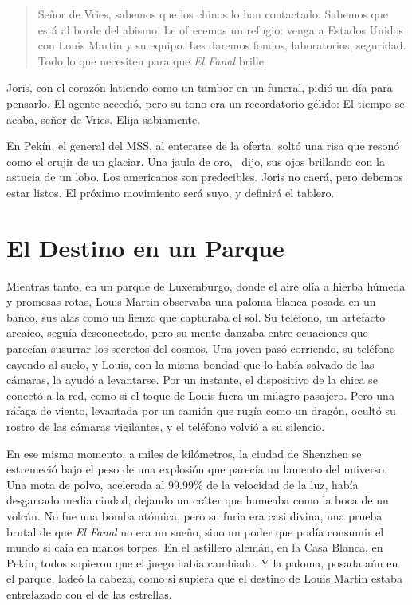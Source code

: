 \begin{quote}
\calli
\glqq Señor de Vries, sabemos que los chinos lo han contactado. Sabemos que está al borde del abismo. Le ofrecemos un refugio: venga a Estados Unidos con Louis Martin y su equipo. Les daremos fondos, laboratorios, seguridad. Todo lo que necesiten para que \emph{El Fanal} brille.\grqq
\end{quote}

Joris, con el corazón latiendo como un tambor en un funeral, pidió un día para pensarlo. El agente accedió, pero su tono era un recordatorio gélido: \glqq El tiempo se acaba, señor de Vries. Elija sabiamente.\grqq

En Pekín, el general del MSS, al enterarse de la oferta, soltó una risa que resonó como el crujir de un glaciar. \glqq Una jaula de oro,\grqq~ dijo, sus ojos brillando con la astucia de un lobo. \glqq Los americanos son predecibles. Joris no caerá, pero debemos estar listos. El próximo movimiento será suyo, y definirá el tablero.\grqq

\section{El Destino en un Parque}

Mientras tanto, en un parque de Luxemburgo, donde el aire olía a hierba húmeda y promesas rotas, Louis Martin observaba una paloma blanca posada en un banco, sus alas como un lienzo que capturaba el sol. Su teléfono, un artefacto arcaico, seguía desconectado, pero su mente danzaba entre ecuaciones que parecían susurrar los secretos del cosmos. Una joven pasó corriendo, su teléfono cayendo al suelo, y Louis, con la misma bondad que lo había salvado de las cámaras, la ayudó a levantarse. Por un instante, el dispositivo de la chica se conectó a la red, como si el toque de Louis fuera un milagro pasajero. Pero una ráfaga de viento, levantada por un camión que rugía como un dragón, ocultó su rostro de las cámaras vigilantes, y el teléfono volvió a su silencio.

En ese mismo momento, a miles de kilómetros, la ciudad de Shenzhen se estremeció bajo el peso de una explosión que parecía un lamento del universo. Una mota de polvo, acelerada al 99.99\% de la velocidad de la luz, había desgarrado media ciudad, dejando un cráter que humeaba como la boca de un volcán. No fue una bomba atómica, pero su furia era casi divina, una prueba brutal de que \emph{El Fanal} no era un sueño, sino un poder que podía consumir el mundo si caía en manos torpes. En el astillero alemán, en la Casa Blanca, en Pekín, todos supieron que el juego había cambiado. Y la paloma, posada aún en el parque, ladeó la cabeza, como si supiera que el destino de Louis Martin estaba entrelazado con el de las estrellas.
